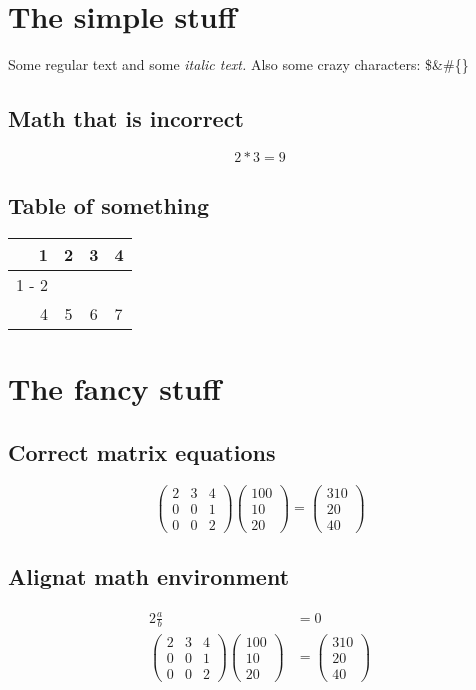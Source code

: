 \documentclass{article}%
\begin{document}
%
\normalsize%
\section{The simple stuff}%
Some regular text and some%
\textit{italic text. }%
\newline%
Also some crazy characters: \$\&\#\{\}%
\subsection{Math that is incorrect}%
\[%
2*3 = 9%
\]

%
\subsection{Table of something}%
\begin{tabular}{rc|cl}%
\hline%
1&2&3&4\\%
\cline{1%
-%
2}%
&&&\\%
4&5&6&7\\%
\end{tabular}

%
\section{The fancy stuff}%
\subsection{Correct matrix equations}%
\[%
\begin{pmatrix}%
2&3&4\\%
0&0&1\\%
0&0&2%
\end{pmatrix} \begin{pmatrix}%
100\\%
10\\%
20%
\end{pmatrix} = \begin{pmatrix}%
310\\%
20\\%
40%
\end{pmatrix}%
\]

%
\subsection{Alignat math environment}%
\begin{alignat*}{2}%
\frac{a}{b} &= 0 \\%
\begin{pmatrix}%
2&3&4\\%
0&0&1\\%
0&0&2%
\end{pmatrix}%
\begin{pmatrix}%
100\\%
10\\%
20%
\end{pmatrix}%
&=%
\begin{pmatrix}%
310\\%
20\\%
40%
\end{pmatrix}%
\end{alignat*}
\end{document}
